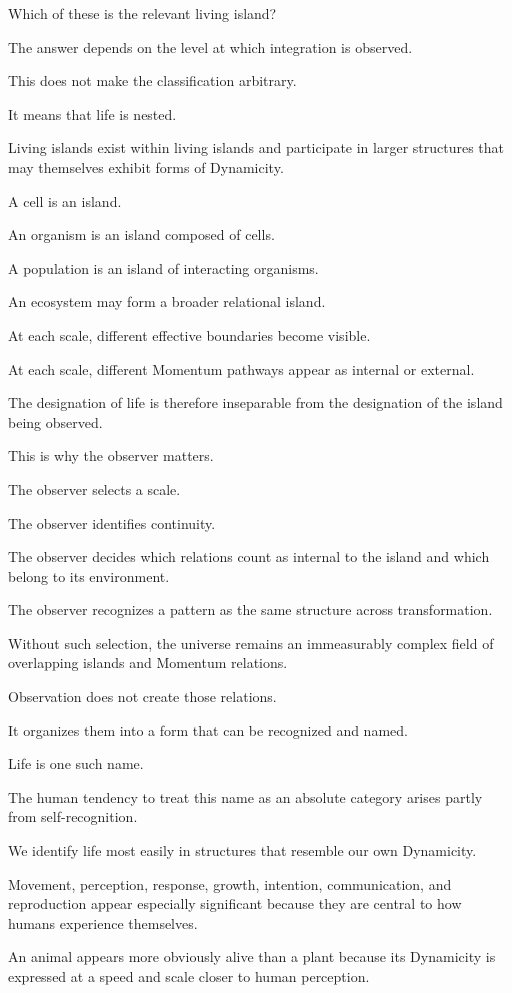 Which of these is the relevant living island?

The answer depends on the level at which integration is observed.

This does not make the classification arbitrary.

It means that life is nested.

Living islands exist within living islands and participate in larger structures that may themselves exhibit forms of Dynamicity.

A cell is an island.

An organism is an island composed of cells.

A population is an island of interacting organisms.

An ecosystem may form a broader relational island.

At each scale, different effective boundaries become visible.

At each scale, different Momentum pathways appear as internal or external.

The designation of life is therefore inseparable from the designation of the island being observed.

This is why the observer matters.

The observer selects a scale.

The observer identifies continuity.

The observer decides which relations count as internal to the island and which belong to its environment.

The observer recognizes a pattern as the same structure across transformation.

Without such selection, the universe remains an immeasurably complex field of overlapping islands and Momentum relations.

Observation does not create those relations.

It organizes them into a form that can be recognized and named.

Life is one such name.

The human tendency to treat this name as an absolute category arises partly from self-recognition.

We identify life most easily in structures that resemble our own Dynamicity.

Movement, perception, response, growth, intention, communication, and reproduction appear especially significant because they are central to how humans experience themselves.

An animal appears more obviously alive than a plant because its Dynamicity is expressed at a speed and scale closer to human perception.

